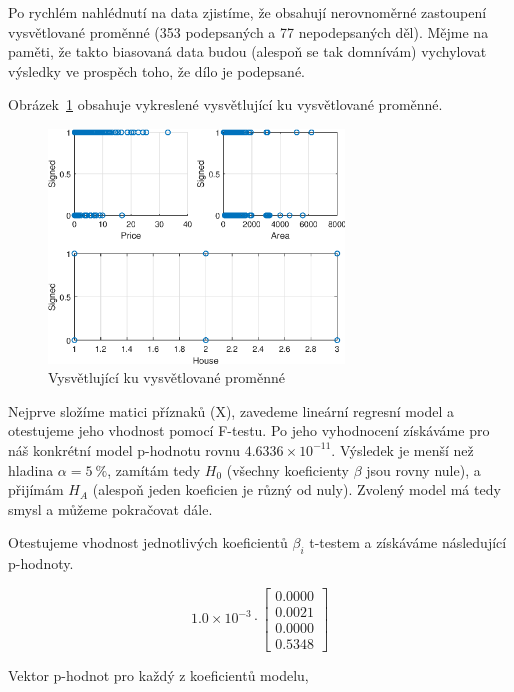 Po rychlém nahlédnutí na data zjistíme, že obsahují nerovnoměrné zastoupení vysvětlované proměnné (353 podepsaných a 77 nepodepsaných děl).
Mějme na paměti, že takto biasovaná data budou (alespoň se tak domnívám) vychylovat výsledky ve prospěch toho, že dílo je podepsané.

Obrázek~\ref{fig:lr1} obsahuje vykreslené vysvětlující ku vysvětlované proměnné.

\begin{figure}[htb]
    \centering
    \includegraphics[width=0.7\textwidth]{graphs/fig1.eps}
    \caption{Vysvětlující ku vysvětlované proměnné}
    \label{fig:lr1}
\end{figure}
\FloatBarrier

Nejprve složíme matici příznaků (X), zavedeme lineární regresní model a otestujeme jeho vhodnost pomocí F-testu.
Po jeho vyhodnocení získáváme pro náš konkrétní model p-hodnotu rovnu \( 4.6336 \times 10^{-11} \).
Výsledek je menší než hladina \( \alpha = 5 \: \% \), zamítám tedy \( H_0 \) (všechny koeficienty \( \beta \) jsou rovny nule), a přijímám \( H_A \) (alespoň jeden koeficien je různý od nuly).
Zvolený model má tedy smysl a můžeme pokračovat dále.

Otestujeme vhodnost jednotlivých koeficientů \( \beta_i \) t-testem a získáváme následující p-hodnoty.

\begin{equation*}
    1.0 \times 10^{-3} \cdot \left[ \begin{matrix} 0.0000 \\ 0.0021 \\ 0.0000 \\ 0.5348 \end{matrix} \right]
\end{equation*}

Vektor p-hodnot pro každý z koeficientů modelu,

